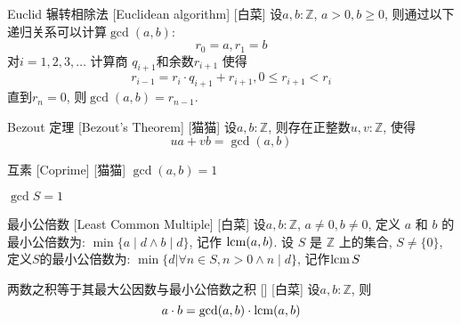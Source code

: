 \documentclass[UTF8]{ctexart}
\begin{document}
            \begin{thm}
                [EuclideanAlgorithm]
                {Euclid 辗转相除法}
                [Euclidean algorithm]
                [白菜]
                设\(a,b:\mathbb{Z}\), \(a>0,b\geq 0\), 则通过以下递归关系可以计算$\gcd(a,b)$:
                \[
                    r_0=a, r_1=b
                \]
                对$i=1,2,3,\ldots$ 计算商 $q_{i+1}$和余数$r_{i+1}$ 使得
                \[
                    r_{i-1}=r_i\cdot q_{i+1}+r_{i+1}, 0\leq r_{i+1}<r_i
                \]
                直到$r_n=0$, 则$\gcd(a,b)=r_{n-1}$.
            \end{thm}

            \begin{thm}
                [BezoutThm]
                {Bezout 定理}
                [Bezout's Theorem]
                [猫猫]
                设$a,b:\mathbb{Z}$, 则存在正整数$u,v:\mathbb{Z}$, 使得
                \[ua+vb=\gcd(a,b)\]
            \end{thm}

            \begin{dfn}
                {互素}
                [Coprime]
                [猫猫]
                    {\(\gcd(a,b)=1\)}

                    {\(\gcd S=1\)}
            \end{dfn}

            \begin{dfn}
                [LCM]
                {最小公倍数}
                [Least Common Multiple]
                [白菜]
                设$a,b:\mathbb{Z}$, $a\neq 0, b\neq 0$, 定义 $a$ 和 $b$ 的最小公倍数为:
                $\min\{a\mid d \land b\mid d\}$, 记作 $\operatorname{lcm}(a,b)$.
                设 $S$ 是 $\mathbb{Z}$ 上的集合, $S\neq \{0\}$, 定义$S$的最小公倍数为:
                $\min\{d|\forall n\in S, n>0 \land n \mid d \}$, 记作$\operatorname{lcm} S$
            \end{dfn}

            \begin{thm}
                [MulEqualsGCDLCM]
                {两数之积等于其最大公因数与最小公倍数之积}
                []
                [白菜]
                设\(a,b:\mathbb{Z}\), 则
                \[a\cdot b=\gcd(a,b)\cdot \operatorname{lcm}(a,b)\]
            \end{thm}
        
\end{document}
